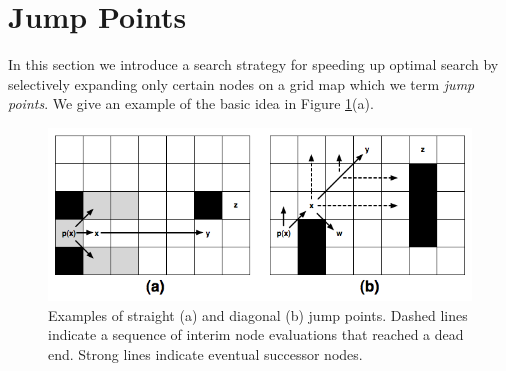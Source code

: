 \section{Jump Points}
In this section we introduce a search strategy for speeding up
optimal search by selectively expanding only certain nodes on a grid map
which we term \emph{jump points}.
We give an example of the basic idea in Figure \ref{fig::jps::jumppoints}(a).

\begin{figure}[tb]
       \begin{center}
		   \includegraphics[width=0.95\columnwidth, trim = 10mm 10mm 10mm 0mm]
			{chapter_jps/diagrams/jumppoints.png}
       \end{center}
	\vspace{-3pt}
       \caption{Examples of straight (a) and diagonal (b) jump points.
Dashed lines indicate a sequence of interim node evaluations that reached
a dead end. Strong lines indicate eventual successor nodes.}
       \label{fig::jps::jumppoints}
\end{figure}

